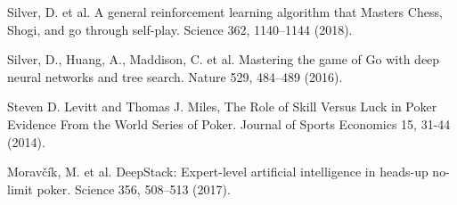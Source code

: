\documentclass[]{article}
\begin{document}
\begin{thebibliography}{9}

	
	Silver, D. et al. A general reinforcement learning algorithm that Masters Chess, Shogi, and go through self-play. Science 362, 1140–1144 (2018). 
	
	Silver, D., Huang, A., Maddison, C. et al. Mastering the game of Go with deep neural networks and tree search. Nature 529, 484–489 (2016). 
	
	Steven D. Levitt and Thomas J. Miles,
	The Role of Skill Versus Luck in Poker Evidence From the World Series of Poker. Journal of Sports Economics 15, 31-44 (2014).
	
	Moravčík, M. et al. DeepStack: Expert-level artificial intelligence in heads-up no-limit poker. Science 356, 508–513 (2017). 
	
\end{thebibliography}
\end{document}

